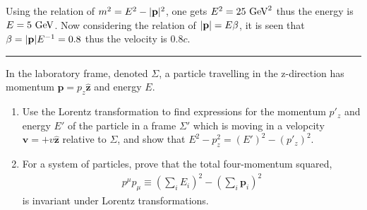 \begin{solution}
Using the relation of $m^2=E^2- | \mathbf{p} |^2 $, one gets $E^2 = 25 \text{ GeV}^2$ thus the energy is $E=5\text{ GeV}$. Now considering the relation of $|\mathbf{p}|=E\beta$, it is seen that $\beta = |\mathbf{p}|E^{-1}=0.8$ thus the velocity is $0.8c$.\\ 
\end{solution} 
\noindent\rule{7in}{1.5pt}


\begin{problem}{2.5}
In the laboratory frame, denoted $\Sigma$, a particle travelling in the z-direction has momentum $\mathbf{p}=p_z \hat{\mathbf
z}$ and energy $E$.
\begin{enumerate}[label=(\alph*)]
    \item Use the Lorentz transformation to find expressions for the momentum $p'_z$ and energy $E'$ of the particle in a frame $\Sigma'$ which is moving in a velopcity $\mathbf{v}=+v\hat{\mathbf
    z}$ relative to $\Sigma$, and show that $E^2-p_z^2=(E')^2-(p'_z)^2$.
    \item For a system of particles, prove that the total four-momentum squared, 
    \begin{align*}
        p^\mu p_\mu \equiv  \left( \sum_{i}E_i \right)^2 - \left( \sum_{i}\mathbf{p}_i \right)^2
    \end{align*}
    is invariant under Lorentz transformations.
\end{enumerate}
\end{problem}


